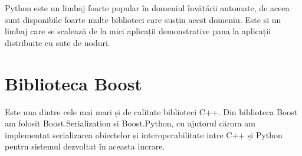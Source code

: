 Python este un limbaj foarte popular în domeniul învățării automate, de aceea sunt disponibile foarte multe biblioteci care susțin acest domeniu.
Este și un limbaj care se scalează de la mici aplicații demonstrative pana la aplicații distribuite cu sute de noduri.












\section{Biblioteca Boost}

Este una dintre cele mai mari și de calitate biblioteci C++.
Din biblioteca Boost am folosit Boost.Serialization si Boost.Python, cu ajutorul cărora am implementat serializarea obiectelor și interoperabilitate intre C++ și Python pentru sistemul dezvoltat în aceasta lucrare.

